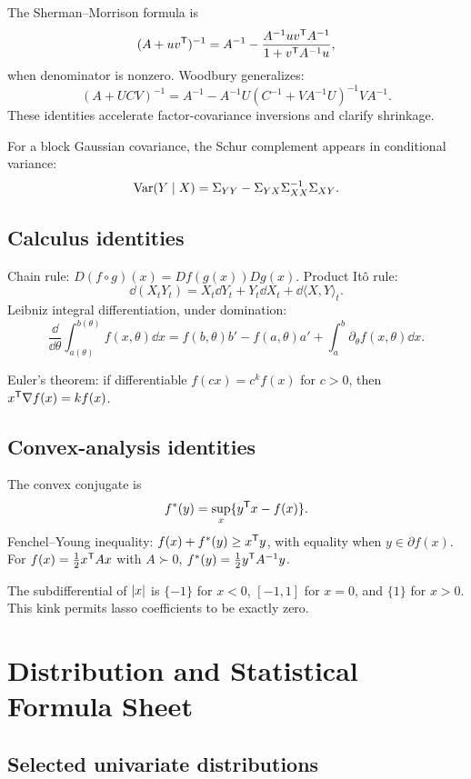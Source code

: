 The Sherman--Morrison formula is
\[
(A+uv^\mathsf T)^{-1}
=A^{-1}-
\frac{A^{-1}uv^\mathsf T A^{-1}}{1+v^\mathsf T A^{-1}u},
\]
when denominator is nonzero. Woodbury generalizes:
\[
(A+UCV)^{-1}
=A^{-1}-A^{-1}U(C^{-1}+VA^{-1}U)^{-1}VA^{-1}.
\]
These identities accelerate factor-covariance inversions and clarify shrinkage.

For a block Gaussian covariance, the Schur complement appears in conditional
variance:
\[
\operatorname{Var}(Y\mid X)=
\Sigma_{YY}-\Sigma_{YX}\Sigma_{XX}^{-1}\Sigma_{XY}.
\]

\section{Calculus identities}

Chain rule:
$D(f\circ g)(x)=Df(g(x))Dg(x)$. Product Itô rule:
\[
\dd(X_tY_t)=X_t\dd Y_t+Y_t\dd X_t+\dd\langle X,Y\rangle_t.
\]
Leibniz integral differentiation, under domination:
\[
\frac{\dd}{\dd\theta}\int_{a(\theta)}^{b(\theta)}
f(x,\theta)\dd x
=f(b,\theta)b'-f(a,\theta)a'
+\int_a^b\partial_\theta f(x,\theta)\dd x.
\]

Euler's theorem: if differentiable $f(cx)=c^kf(x)$ for $c>0$, then
$x^\mathsf T\nabla f(x)=kf(x)$.

\section{Convex-analysis identities}

The convex conjugate is
\[
f^\ast(y)=\sup_x\{y^\mathsf T x-f(x)\}.
\]
Fenchel--Young inequality:
$f(x)+f^\ast(y)\geq x^\mathsf T y$, with equality when
$y\in\partial f(x)$. For $f(x)=\frac12x^\mathsf T Ax$ with $A\succ0$,
$f^\ast(y)=\frac12y^\mathsf T A^{-1}y$.

The subdifferential of $\left|x\right|$ is $\{-1\}$ for $x<0$, $[-1,1]$ for $x=0$, and
$\{1\}$ for $x>0$. This kink permits lasso coefficients to be exactly zero.


\chapter{Distribution and Statistical Formula Sheet}

\section{Selected univariate distributions}

